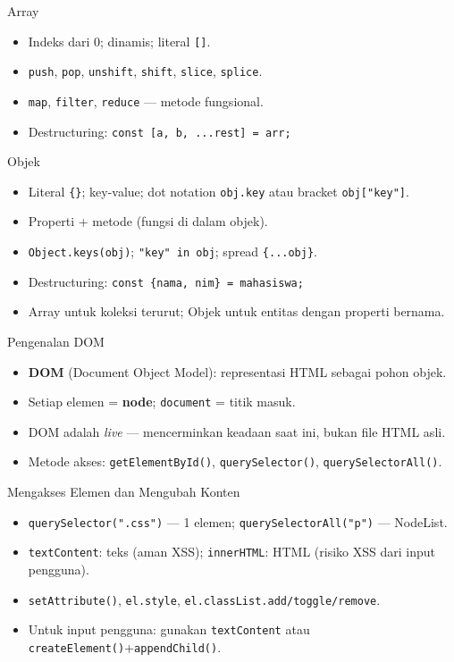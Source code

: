 \documentclass[handout]{beamer}
\begin{document}
\begin{frame}{Array}
	\begin{itemize}
		\item Indeks dari 0; dinamis; literal \texttt{[]}.
		\item \texttt{push}, \texttt{pop}, \texttt{unshift}, \texttt{shift}, \texttt{slice}, \texttt{splice}.
		\item \texttt{map}, \texttt{filter}, \texttt{reduce} --- metode fungsional.
		\item Destructuring: \texttt{const [a, b, ...rest] = arr;}
	\end{itemize}
\end{frame}

\begin{frame}{Objek}
	\begin{itemize}
		\item Literal \texttt{\{\}}; key-value; dot notation \texttt{obj.key} atau bracket \texttt{obj["key"]}.
		\item Properti + metode (fungsi di dalam objek).
		\item \texttt{Object.keys(obj)}; \texttt{"key" in obj}; spread \texttt{\{...obj\}}.
		\item Destructuring: \texttt{const \{nama, nim\} = mahasiswa;}
		\item Array untuk koleksi terurut; Objek untuk entitas dengan properti bernama.
	\end{itemize}
\end{frame}

\begin{frame}{Pengenalan DOM}
	\begin{itemize}
		\item \textbf{DOM} (Document Object Model): representasi HTML sebagai pohon objek.
		\item Setiap elemen = \textbf{node}; \texttt{document} = titik masuk.
		\item DOM adalah \textit{live} --- mencerminkan keadaan saat ini, bukan file HTML asli.
		\item Metode akses: \texttt{getElementById()}, \texttt{querySelector()}, \texttt{querySelectorAll()}.
	\end{itemize}
\end{frame}

\begin{frame}{Mengakses Elemen dan Mengubah Konten}
	\begin{itemize}
		\item \texttt{querySelector(".css")} --- 1 elemen; \texttt{querySelectorAll("p")} --- NodeList.
		\item \texttt{textContent}: teks (aman XSS); \texttt{innerHTML}: HTML (risiko XSS dari input pengguna).
		\item \texttt{setAttribute()}, \texttt{el.style}, \texttt{el.classList.add/toggle/remove}.
		\item Untuk input pengguna: gunakan \texttt{textContent} atau \texttt{createElement()}+\texttt{appendChild()}.
	\end{itemize}
\end{frame}
\end{document}
